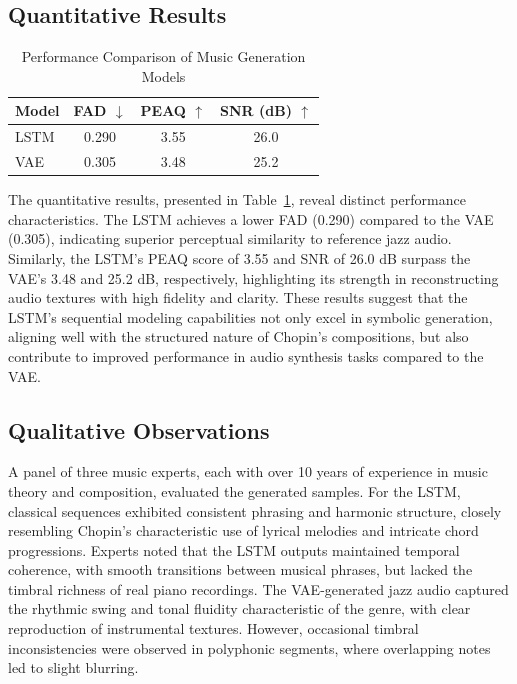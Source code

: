 \documentclass[conference]{IEEEtran}
\begin{document}
\subsection{Quantitative Results}
\begin{table}[H]
    \centering
    \caption{Performance Comparison of Music Generation Models}
    \label{tab:evaluation-metrics}
    \begin{tabular}{lccc}
        \toprule
        \textbf{Model} & \textbf{FAD $\downarrow$} & \textbf{PEAQ $\uparrow$} & \textbf{SNR (dB) $\uparrow$} \\
        \midrule
        LSTM & 0.290 & 3.55 & 26.0 \\
        VAE & 0.305 & 3.48 & 25.2 \\
        \bottomrule
    \end{tabular}
\end{table}

The quantitative results, presented in Table~\ref{tab:evaluation-metrics}, reveal distinct performance characteristics. The LSTM achieves a lower FAD (0.290) compared to the VAE (0.305), indicating superior perceptual similarity to reference jazz audio. Similarly, the LSTM’s PEAQ score of 3.55 and SNR of 26.0 dB surpass the VAE’s 3.48 and 25.2 dB, respectively, highlighting its strength in reconstructing audio textures with high fidelity and clarity. These results suggest that the LSTM’s sequential modeling capabilities not only excel in symbolic generation, aligning well with the structured nature of Chopin’s compositions, but also contribute to improved performance in audio synthesis tasks compared to the VAE.

\subsection{Qualitative Observations}
A panel of three music experts, each with over 10 years of experience in music theory and composition, evaluated the generated samples. For the LSTM, classical sequences exhibited consistent phrasing and harmonic structure, closely resembling Chopin’s characteristic use of lyrical melodies and intricate chord progressions. Experts noted that the LSTM outputs maintained temporal coherence, with smooth transitions between musical phrases, but lacked the timbral richness of real piano recordings. The VAE-generated jazz audio captured the rhythmic swing and tonal fluidity characteristic of the genre, with clear reproduction of instrumental textures. However, occasional timbral inconsistencies were observed in polyphonic segments, where overlapping notes led to slight blurring.
\end{document}
